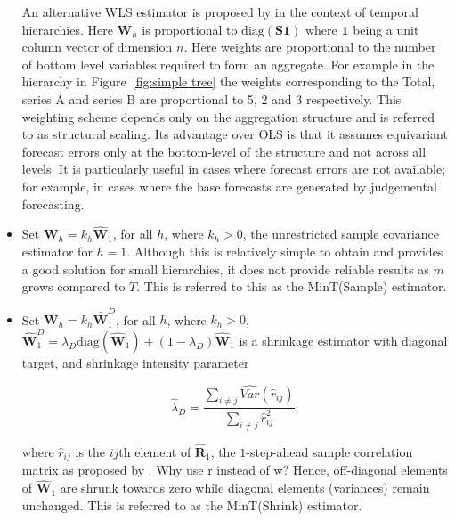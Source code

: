 \documentclass[graybox]{svmult}
\begin{document}
\begin{itemize}
        An alternative WLS estimator is proposed by \citet{AthEtAl2017} in the context of temporal hierarchies. Here $\bm{W}_{h}$ is proportional to $\text{diag}(\bm{S}\bm{1})$ where $\bm{1}$ being a unit column vector of dimension $n$.  Here weights are proportional to the number of bottom level variables required to form an aggregate. For example in the hierarchy in Figure~\ref{fig:simple tree} the weights corresponding to the Total, series A and series B are proportional to 5, 2 and 3 respectively.
        This weighting scheme depends only on the aggregation structure and is referred to as structural scaling. Its advantage over OLS is that it assumes equivariant forecast errors only at the bottom-level of the structure and not across all levels. It is particularly useful in cases where forecast errors are not available; for example, in cases where the base forecasts are generated by judgemental forecasting.

    \item  Set $\bm{W}_{h}=k_{h}\hat{\bm{W}}_{1}$, for all $h$, where $k_{h} > 0$, the unrestricted sample covariance estimator for $h=1$. Although this is relatively simple to obtain and provides a good solution for small hierarchies, it does not provide reliable results as $m$ grows compared to $T$. This is referred to this as the MinT(Sample) estimator.
    \item Set $\bm{W}_{h}=k_{h}\hat{\bm{W}}_{1}^D$, for all $h$, where $k_{h} > 0$, $\hat{\bm{W}}^{D}_{1} = \lambda_{D} \text{diag}(\hat{\bm{W}}_{1}) + (1 - \lambda_{D})\hat{\bm{W}}_{1}$ is a shrinkage estimator with diagonal target, and shrinkage intensity parameter

        $$\hat{\lambda}_{D} = \frac{\sum_{i \ne j}\hat{Var}(\hat{r}_{ij})}{\sum_{i \ne j}\hat{r}_{ij}^2},$$


        where $\hat{r}_{ij}$ is the $ij$th element of $\hat{\bm{R}}_{1}$, the $1$-step-ahead sample correlation matrix as proposed by \citet{Schafer2005}. {\color{red} Why use r instead of w?} Hence, off-diagonal elements of $\hat{\bm{W}}_1$ are shrunk towards zero while diagonal elements (variances) remain unchanged. This is referred to as the MinT(Shrink) estimator.
\end{itemize}
\end{document}
